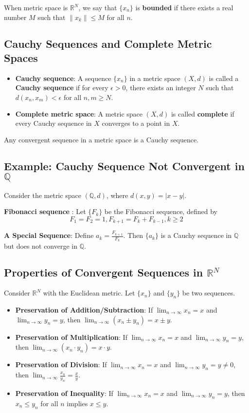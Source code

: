 \begin{definition}
    When metric space is $\mathbb{R}^N$, we say that $\{x_n\}$ is \textbf{bounded} if there exists a real number $M$ such that $\|x_k\| \leq M$ for all $n$.
\end{definition}
\subsection{Cauchy Sequences and Complete Metric Spaces}
\begin{itemize}
    \item \textbf{Cauchy sequence}: A sequence $\{x_n\}$ in a metric space $(X,d)$ is called a \textbf{Cauchy sequence} if for every $\epsilon > 0$, there exists an integer $N$ such that $d(x_n,x_m) < \epsilon$ for all $n,m \geq N$.
    \item \textbf{Complete metric space}: A metric space $(X,d)$ is called \textbf{complete} if every Cauchy sequence in $X$ converges to a point in $X$.
\end{itemize}
\begin{theorem}
    Any convergent sequence in a metric space is a Cauchy sequence.
\end{theorem}
\subsection{Example: Cauchy Sequence Not Convergent in $\mathbb{Q}$}
Consider the metric space $(\mathbb{Q},d)$, where $d(x,y) = |x-y|$. 

\textbf{Fibonacci sequence} :
Let $\{F_k\}$ be the Fibonacci sequence, defined by $$F_1 = F_2 = 1, F_{k+1} = F_k + F_{k-1}, k \geq 2$$ 

\textbf{A Special Sequence}:
Define $a_k = \frac{F_{k+1}}{F_k}$. Then $\{a_k\}$ is a Cauchy sequence in $\mathbb{Q}$ but does not converge in $\mathbb{Q}$.
\subsection{Properties of Convergent Sequences in $\mathbb{R}^N$}
Consider $\mathbb{R}^N$ with the Euclidean metric. Let $\{x_n\}$ and $\{y_n\}$ be two sequences.
\begin{itemize}
    \item \textbf{Preservation of Addition/Subtraction}: If $\lim_{n \rightarrow \infty} x_n = x$ and $\lim_{n \rightarrow \infty} y_n = y$, then $\lim_{n \rightarrow \infty} (x_n \pm y_n) = x \pm y$.
    \item \textbf{Preservation of Multiplication}: If $\lim_{n \rightarrow \infty} x_n = x$ and $\lim_{n \rightarrow \infty} y_n = y$, then $\lim_{n \rightarrow \infty} (x_n \cdot y_n) = x \cdot y$.
    \item \textbf{Preservation of Division}: If $\lim_{n \rightarrow \infty} x_n = x$ and $\lim_{n \rightarrow \infty} y_n = y \neq 0$, then $\lim_{n \rightarrow \infty} \frac{x_n}{y_n} = \frac{x}{y}$.
    \item \textbf{Preservation of Inequality}: If $\lim_{n \rightarrow \infty} x_n = x$ and $\lim_{n \rightarrow \infty} y_n = y$, then $x_n \leq y_n$ for all $n$ implies $x \leq y$.
\end{itemize}

